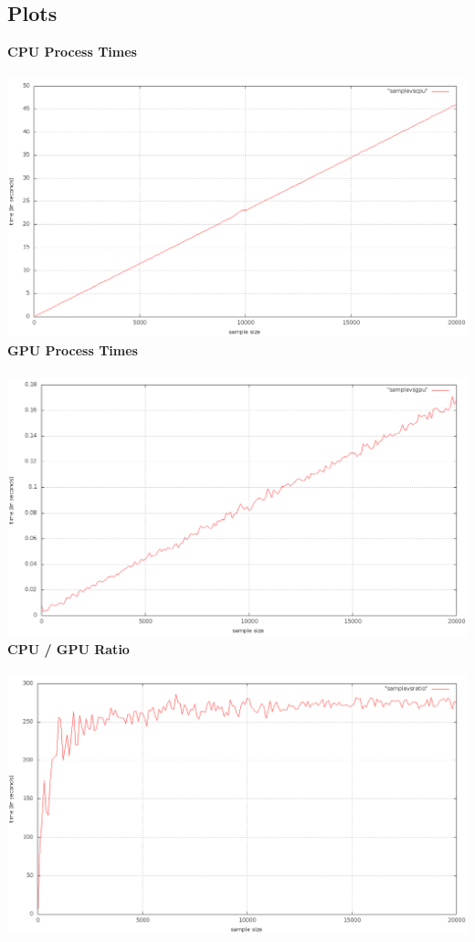 \subsection{Plots}
\vspace{1cm}
\textbf{CPU Process Times}\\\\
\includegraphics [width=1.2\textwidth]{cpu.png}
\newpage
\textbf{GPU Process Times}\\\\
\includegraphics [width=1.2\textwidth]{gpu.png}
\textbf{CPU / GPU Ratio}\\\\
\includegraphics [width=1.2\textwidth]{ratio.png}


